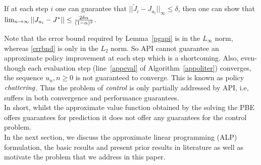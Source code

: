 \begin{lemma}\label{pgapi}
If at each step $i$ one can guarantee that $||\tilde{J}_i-J_{u_i}||_\infty\leq \delta$, then one can show that $\lim_{n\rightarrow\infty}||J_{u_i}-J^*||\leq \frac{2\delta\alpha}{(1-\alpha)^2}$.
\end{lemma}
Note that the error bound required by Lemma~\ref{pgapi} is in the $L_\infty$ norm, whereas \eqref{errbnd} is only in the $L_2$ norm. So API cannot guarantee an approximate policy improvement at each step which is a shortcoming. Also, even-though each evaluation step (line~\ref{appeval} of Algorithm~\ref{appoliter}) converges, the sequence ${u_n}, n\geq0$ is not guaranteed to converge. This is known as policy $\emph{chattering}$. Thus the problem of $\emph{control}$ is only partially addressed by API, i.e, suffers in both convergence and performance guarantees. \\
In short, whilst the approximate value function obtained by the solving the PBE offers guarantees for prediction it does not offer any guarantees for the control problem. \\
In the next section, we discuss the approximate linear programming (ALP) formulation, the basic results and present prior results in literature as well as motivate the problem that we address in this paper. 


